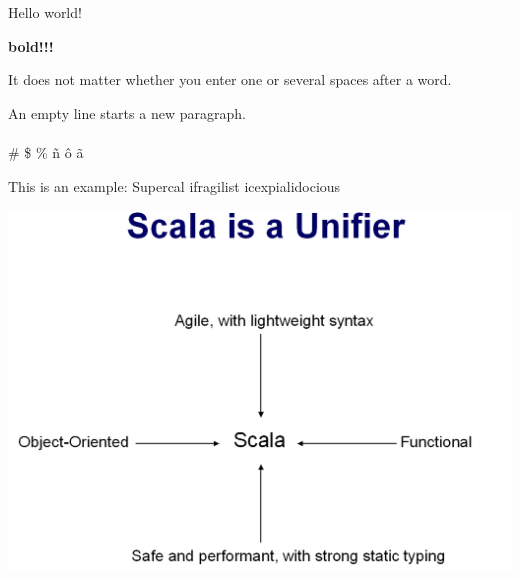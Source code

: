 \documentclass{article}
\begin{document}
Hello world!

\textbf{bold!!!}

It does not matter whether you
enter one or several             spaces
after a word.

An empty line starts a new
paragraph.
\\ \\
\# \$ \% \~n \^o \~a

This is an %
example: Supercal%
            ifragilist%
icexpialidocious

\includegraphics[scale=0.33]{Scala-is-a-Unifier.png}
\end{document}
